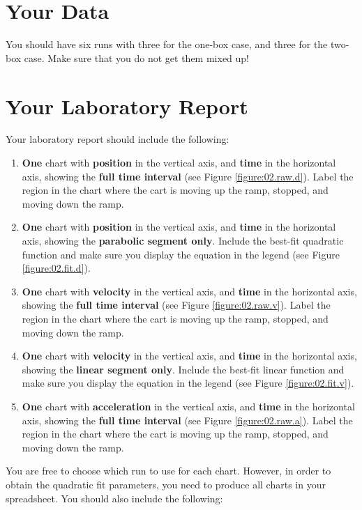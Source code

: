 \section{Your Data}
You should have six runs with three for the one-box case, and three for the two-box case. Make sure that you do not get them mixed up!
\newpage
\section{Your Laboratory Report}
Your laboratory report should include the following:
\begin{enumerate}
    \item \textbf{One} chart with \textbf{position} in the vertical axis, and \textbf{time} in the horizontal axis, showing the \textbf{full time interval} (see Figure \ref{figure:02.raw.d}). Label the region in the chart where the cart is moving up the ramp, stopped, and moving down the ramp.
    \item \textbf{One} chart with \textbf{position} in the vertical axis, and \textbf{time} in the horizontal axis, showing the \textbf{parabolic segment only}. Include the best-fit quadratic function and make sure you display the equation in the legend (see Figure \ref{figure:02.fit.d}). 
    \item \textbf{One} chart with \textbf{velocity} in the vertical axis, and \textbf{time} in the horizontal axis, showing the \textbf{full time interval} (see Figure \ref{figure:02.raw.v}). Label the region in the chart where the cart is moving up the ramp, stopped, and moving down the ramp.
    \item \textbf{One} chart with \textbf{velocity} in the vertical axis, and \textbf{time} in the horizontal axis, showing the \textbf{linear segment only}. Include the best-fit linear function and make sure you display the equation in the legend (see Figure \ref{figure:02.fit.v}).
    \item \textbf{One} chart with \textbf{acceleration} in the vertical axis, and \textbf{time} in the horizontal axis, showing the \textbf{full time interval} (see Figure \ref{figure:02.raw.a}). Label the region in the chart where the cart is moving up the ramp, stopped, and moving down the ramp.
\end{enumerate}
You are free to choose which run to use for each chart. However, in order to obtain the quadratic fit parameters, you need to produce all charts in your spreadsheet. You should also include the following:
